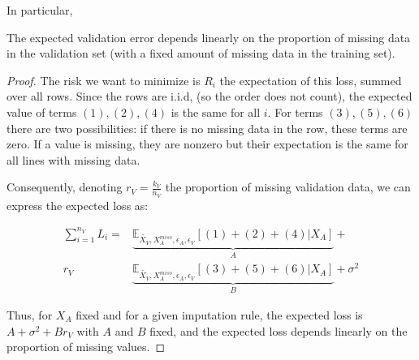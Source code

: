 In particular,
\begin{proposition}
\label{prop.linear}
The expected validation error depends linearly on the proportion of missing data in the validation set (with a fixed amount of missing data in the training set).
\end{proposition}
\begin{proof}
The risk we want to minimize is $R_i$ the expectation of this loss, summed over all rows. Since the rows are i.i.d, (so the order does not count), the expected value of terms $(1),(2),(4)$ is the same for all $i$. For terms $(3), (5), (6)$ there are two possibilities: if there is no missing data in the row, these terms are zero. If a value is missing, they are nonzero but their expectation is the same for all lines with missing data. 

Consequently, denoting $r_V = \frac{k_V}{n_V}$ the proportion of missing validation data, we can express the expected loss as:

\begin{align}
\label{eq.loss}
\sum\limits_{i=1}^{n_V} L_i = &\underbrace{\mathbb{E}_{\tilde{X_V}, X_A^{miss}, \epsilon_A, \epsilon_V}[(1) + (2) + (4)\vert X_A]}_{A} + \\ 
r_V& \underbrace{\mathbb{E}_{\tilde{X_V}, X_A^{miss}, \epsilon_A, \epsilon_V}[(3) + (5) + (6)\vert X_A]}_{B} + \sigma^2
\end{align}

Thus, for $X_A$ fixed and for a given imputation rule, the expected loss is $A + \sigma^2 + Br_V$ with $A$ and $B$ fixed, and the expected loss depends linearly on the proportion of missing values. 
\end{proof}




